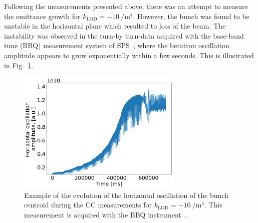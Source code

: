 Following the measurements presented above, there was an attempt to measure the emittance growth for $k_\mathrm{LOD}=-10 \ \mathrm{/m^4}$. However, the bunch was found to be unstable in the horizontal plane which resulted to loss of the beam. The instability was observed in the turn-by turn-data acquired with the base-band tune (BBQ) measurement system of SPS~\cite{Boccardi:1055568}, where the betatron oscillation amplitude appears to grow exponentially within a few seconds. This is illustrated in Fig.~\ref{fig:instability_BBQ_klod-15_4may2022}.






\begin{figure}[!h]
   \centering         
   \includegraphics[width=0.7\textwidth]{images/Ch8/2022.05.16.17.49.04.430450.png}
       \caption{Example of the evolution of the horizontal oscillation of the bunch centroid during the CC measurements for $k_\mathrm{LOD}=-10 \ \mathrm{/m^4}$. This measurement is acquired with the BBQ instrument~\cite{Boccardi:1055568}.}
       \label{fig:instability_BBQ_klod-15_4may2022}
\end{figure}


